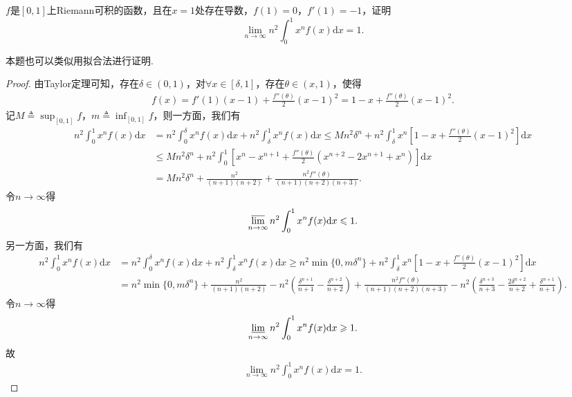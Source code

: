 \documentclass[../../main.tex]{subfiles}
\begin{document}
\begin{example}
$f$是$[0,1]$上Riemann可积的函数，且在$x=1$处存在导数，$f(1)=0$，$f'(1)=-1$，证明$$\lim\limits_{n \to \infty} n^2 \int_0^1 x^n f(x) \mathrm{d}x = 1.$$
\end{example}
\begin{note}
本题也可以类似用拟合法进行证明.
\end{note}
\begin{proof}
由Taylor定理可知，存在$\delta \in (0,1)$，对$\forall x\in [\delta,1]$，存在$\theta \in (x,1)$，使得
\begin{align*}
f(x) = f'(1)(x-1) + \frac{f''(\theta)}{2}(x-1)^2 = 1 - x + \frac{f''(\theta)}{2}(x-1)^2.
\end{align*}
记$M \triangleq \sup_{[0,1]}f$，$m \triangleq \inf_{[0,1]}f$，则一方面，我们有
\begin{align*}
n^2\int_0^1 x^n f(x) \mathrm{d}x &= n^2\int_0^\delta x^n f(x) \mathrm{d}x + n^2\int_\delta^1 x^n f(x) \mathrm{d}x \leqslant Mn^2\delta^n + n^2\int_\delta^1 x^n \left[1 - x + \frac{f''(\theta)}{2}(x - 1)^2\right] \mathrm{d}x \\
&\leqslant Mn^2\delta^n + n^2\int_0^1 \left[x^n - x^{n+1} + \frac{f''(\theta)}{2}(x^{n+2} - 2x^{n+1} + x^n)\right] \mathrm{d}x \\
&= Mn^2\delta^n + \frac{n^2}{(n+1)(n+2)} + \frac{n^2 f''(\theta)}{(n+1)(n+2)(n+3)}.
\end{align*}
令$n \to \infty$得
\begin{align*}
\varlimsup_{n \to \infty} n^2\int_0^1 x^n f(x) \mathrm{d}x \leqslant 1.
\end{align*}
另一方面，我们有
\begin{align*}
n^2\int_0^1 x^n f(x) \mathrm{d}x &= n^2\int_0^\delta x^n f(x) \mathrm{d}x + n^2\int_\delta^1 x^n f(x) \mathrm{d}x \geqslant n^2\min\{0, m\delta^n\} + n^2\int_\delta^1 x^n \left[1 - x + \frac{f''(\theta)}{2}(x - 1)^2\right] \mathrm{d}x \\
&= n^2\min\{0, m\delta^n\} + \frac{n^2}{(n+1)(n+2)} - n^2\left(\frac{\delta^{n+1}}{n+1} - \frac{\delta^{n+2}}{n+2}\right) + \frac{n^2 f''(\theta)}{(n+1)(n+2)(n+3)} - n^2\left(\frac{\delta^{n+3}}{n+3} - \frac{2\delta^{n+2}}{n+2} + \frac{\delta^{n+1}}{n+1}\right).
\end{align*}
令$n \to \infty$得
\begin{align*}
\varliminf_{n \to \infty} n^2\int_0^1 x^n f(x) \mathrm{d}x \geqslant 1.
\end{align*}
故
\begin{align*}
\lim_{n \to \infty} n^2\int_0^1 x^n f(x) \mathrm{d}x = 1.
\end{align*}

\end{proof}
\end{document}

